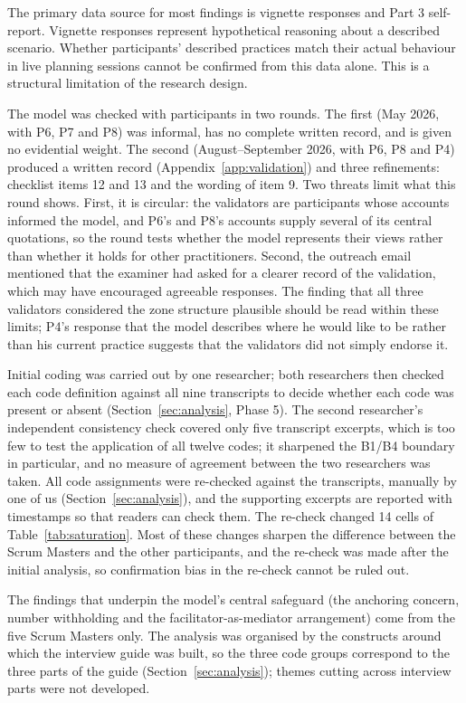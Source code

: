 \documentclass[a4paper,twoside]{bth}
\begin{document}
The primary data source for most findings is vignette responses and Part 3 self-report. Vignette responses represent hypothetical reasoning about a described scenario. Whether participants' described practices match their actual behaviour in live planning sessions cannot be confirmed from this data alone. This is a structural limitation of the research design.

The model was checked with participants in two rounds. The first (May 2026, with P6, P7 and P8) was informal, has no complete written record, and is given no evidential weight. The second (August--September 2026, with P6, P8 and P4) produced a written record (Appendix~\ref{app:validation}) and three refinements: checklist items 12 and 13 and the wording of item 9. Two threats limit what this round shows. First, it is circular: the validators are participants whose accounts informed the model, and P6's and P8's accounts supply several of its central quotations, so the round tests whether the model represents their views rather than whether it holds for other practitioners. Second, the outreach email mentioned that the examiner had asked for a clearer record of the validation, which may have encouraged agreeable responses. The finding that all three validators considered the zone structure plausible should be read within these limits; P4's response that the model describes where he would like to be rather than his current practice suggests that the validators did not simply endorse it.

Initial coding was carried out by one researcher; both researchers then checked each code definition against all nine transcripts to decide whether each code was present or absent (Section~\ref{sec:analysis}, Phase 5). The second researcher's independent consistency check covered only five transcript excerpts, which is too few to test the application of all twelve codes; it sharpened the B1/B4 boundary in particular, and no measure of agreement between the two researchers was taken. All code assignments were re-checked against the transcripts, manually by one of us (Section~\ref{sec:analysis}), and the supporting excerpts are reported with timestamps so that readers can check them. The re-check changed 14 cells of Table~\ref{tab:saturation}. Most of these changes sharpen the difference between the Scrum Masters and the other participants, and the re-check was made after the initial analysis, so confirmation bias in the re-check cannot be ruled out.

The findings that underpin the model's central safeguard (the anchoring concern, number withholding and the facilitator-as-mediator arrangement) come from the five Scrum Masters only. The analysis was organised by the constructs around which the interview guide was built, so the three code groups correspond to the three parts of the guide (Section~\ref{sec:analysis}); themes cutting across interview parts were not developed.
\end{document}
